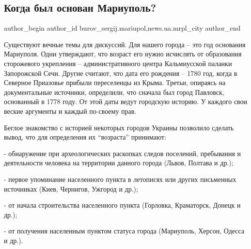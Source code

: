  
 
 
 
 
 
\subsection{Когда был основан Мариуполь?}
\label{sec:14_04_2018.stz.news.ua.mrpl_city.1.kogda_byl_osnovan_mariupol}
 
\ifcmt
 author_begin
   author_id burov_sergij.mariupol,news.ua.mrpl_city
 author_end
\fi


Существуют вечные темы для дискуссий. Для нашего города – это год основания
Мариуполя. Одни утверждают, что возраст его нужно исчислять от образования
сторожевого укрепления – административного центра Кальмиусской паланки
Запорожской Сечи. Другие считают, что дата его рождения – 1780 год, когда в
Северное Приазовье прибыли переселенцы из Крыма. Третьи, опираясь на
документальные источники, определили, что сначала был город Павловск,
основанный в 1778 году. От этой даты ведут городскую историю. У каждого свои
веские аргументы и каждый по-своему прав.


Беглое знакомство с историей некоторых городов Украины позволило сделать вывод,
что для определения их \enquote{возраста} принимают:

- обнаружение при археологических раскопках следов поселений, пребывания и
деятельности человека на территории данного города (Львов, Полтава и др.);

- первое упоминание населенного пункта в летописях или других письменных
источниках (Киев, Чернигов, Ужгород и др.);

- от начала строительства населенного пункта (Горловка, Краматорск, Донецк и
др.);

- от получения населенным пунктом статуса города (Мариуполь, Херсон, Одесса и
др.).

